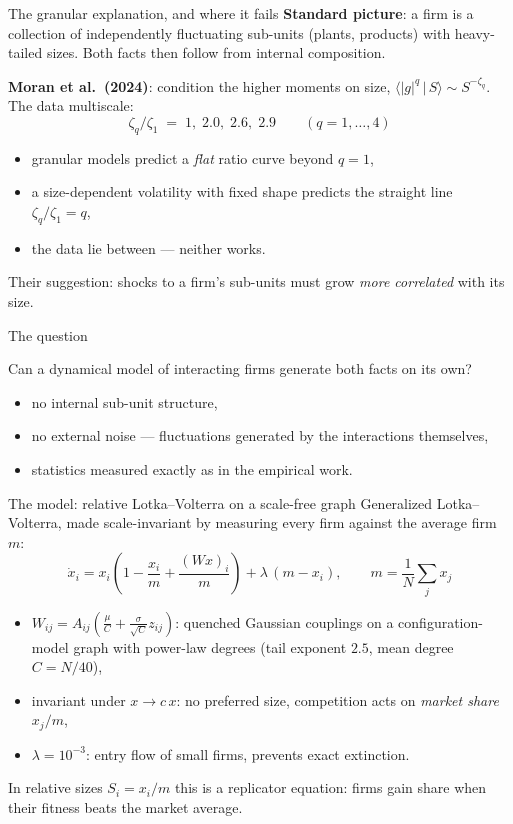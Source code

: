 \documentclass[aspectratio=169,10pt]{beamer}
\begin{document}
\begin{frame}{The granular explanation, and where it fails}
  \textbf{Standard picture}: a firm is a collection of independently fluctuating
  sub-units (plants, products) with heavy-tailed sizes. Both facts then follow from
  internal composition.
  \medskip

  \textbf{Moran et al.\ (2024)}: condition the higher moments on size,
  $\langle |g|^q \,|\, S\rangle \sim S^{-\zeta_q}$. The data multiscale:
  \[ \zeta_q/\zeta_1 \;=\; 1,\; 2.0,\; 2.6,\; 2.9 \qquad (q = 1,\dots,4) \]
  \begin{itemize}
    \item granular models predict a \emph{flat} ratio curve beyond $q=1$,
    \item a size-dependent volatility with fixed shape predicts the straight line $\zeta_q/\zeta_1 = q$,
    \item the data lie between --- neither works.
  \end{itemize}
  Their suggestion: shocks to a firm's sub-units must grow \emph{more correlated} with its size.
\end{frame}

\begin{frame}{The question}
  \begin{center}
    {\Large Can a dynamical model of \alert{interacting firms} generate both facts on its own?}
  \end{center}
  \bigskip
  \begin{itemize}
    \item no internal sub-unit structure,
    \item no external noise --- fluctuations generated by the interactions themselves,
    \item statistics measured exactly as in the empirical work.
  \end{itemize}
\end{frame}

\begin{frame}{The model: relative Lotka--Volterra on a scale-free graph}
  Generalized Lotka--Volterra, made scale-invariant by measuring every firm
  against the average firm $m$:
  \[
    \dot{x}_i = x_i \left( 1 - \frac{x_i}{m} + \frac{(Wx)_i}{m} \right)
    + \lambda\,(m - x_i),
    \qquad m = \frac{1}{N}\sum_j x_j
  \]
  \begin{itemize}
    \item $W_{ij} = A_{ij}\left(\frac{\mu}{C} + \frac{\sigma}{\sqrt{C}} z_{ij}\right)$:
      quenched Gaussian couplings on a configuration-model graph with power-law
      degrees (tail exponent $2.5$, mean degree $C = N/40$),
    \item invariant under $x \to c\,x$: no preferred size, competition acts on
      \emph{market share} $x_j/m$,
    \item $\lambda = 10^{-3}$: entry flow of small firms, prevents exact extinction.
  \end{itemize}
  \medskip
  In relative sizes $S_i = x_i/m$ this is a replicator equation: firms gain share
  when their fitness beats the market average.
\end{frame}
\end{document}
